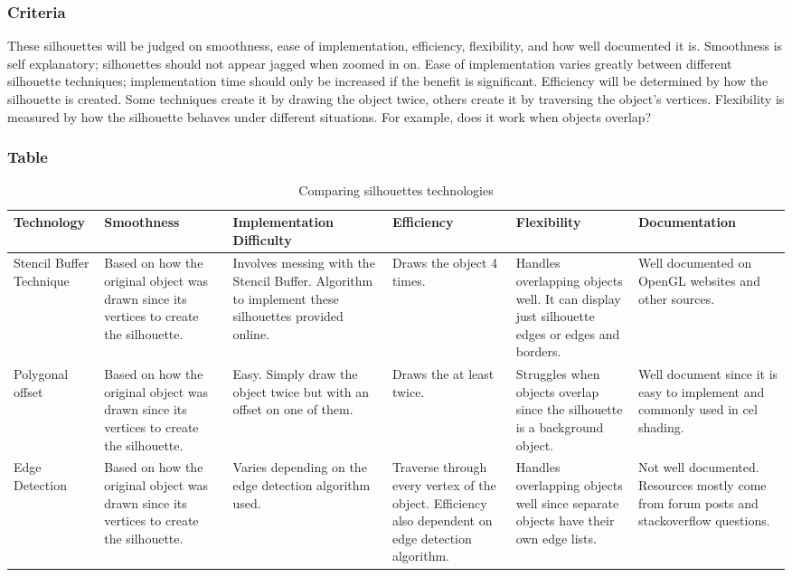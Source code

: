 \documentclass[10pt,journal,compsoc,draftclsnofoot]{IEEEtran}
\begin{document}
\subsubsection{Criteria}
These silhouettes will be judged on smoothness, ease of implementation, efficiency, flexibility, and how well documented it is.
Smoothness is self explanatory; silhouettes should not appear jagged when zoomed in on.
Ease of implementation varies greatly between different silhouette techniques; implementation time should only be increased if the benefit is significant.
Efficiency will be determined by how the silhouette is created. Some techniques create it by drawing the object twice, others create it by traversing the object's vertices.
Flexibility is measured by how the silhouette behaves under different situations. For example, does it work when objects overlap?

\subsubsection{Table}
\begin{center}
\begin{table}[H]
\begin{tabular}{ | m{7em} | m{7em} | m{7em} | m{7em} | m{7em} | m{7em} |  } 
\hline
\textbf{Technology}  & \textbf{Smoothness} & \textbf{Implementation Difficulty} & \textbf{Efficiency} & \textbf{Flexibility} & \textbf{Documentation} \\ \hline
Stencil Buffer Technique & Based on how the original object was drawn since its vertices to create the silhouette. & Involves messing with the Stencil Buffer. Algorithm to implement these silhouettes provided online. & Draws the object 4 times. & Handles overlapping objects well. It can display just silhouette edges or edges and borders. & Well documented on OpenGL websites and other sources.  \\ \hline
Polygonal offset & Based on how the original object was drawn since its vertices to create the silhouette. & Easy. Simply draw the object twice but with an offset on one of them. & Draws the at least twice. & Struggles when objects overlap since the silhouette is a background object. & Well document since it is easy to implement and commonly used in cel shading.  \\ \hline
Edge Detection & Based on how the original object was drawn since its vertices to create the silhouette. & Varies depending on the edge detection algorithm used. & Traverse through every vertex of the object. Efficiency also dependent on edge detection algorithm. & Handles overlapping objects well since separate objects have their own edge lists. & Not well documented. Resources mostly come from forum posts and stackoverflow questions. \\ \hline
\end{tabular}
\newline
\caption{Comparing silhouettes technologies}
\label{table:silhouettes}
\end{table}
\end{center}
\end{document}
